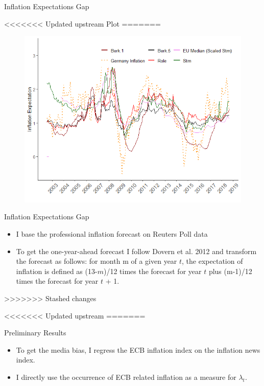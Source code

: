 \documentclass[aspectratio=169,xcolor=dvipsnames]{beamer}
\begin{document}
\begin{frame}{Inflation Expectations Gap}

<<<<<<< Updated upstream
Plot
=======
  \begin{figure}[!ht]
    \centering
    \includegraphics{Household_Inf_Exp.png}
    \end{figure}

\end{frame}


\begin{frame}{Inflation Expectations Gap}

 \begin{itemize}
 \item I base the professional inflation forecast on Reuters Poll data
 \item To get the one-year-ahead forecast I follow Dovern et al. 2012 and transform the forecast as follows: for month m of a given year $t$, the expectation of inflation is defined as (13-$m$)/12 times the forecast for year $t$ plus (m-1)/12 times the forecast for year $t$ + 1.
 \end{itemize}
>>>>>>> Stashed changes

\end{frame}


<<<<<<< Updated upstream
=======
\begin{frame}{Preliminary Results}

 \begin{itemize}
 \item To get the media bias, I regress the ECB inflation index on the inflation news index.
 \item I directly use the occurrence of ECB related inflation as a measure for $\lambda_t$.
 \end{itemize}

\end{frame}
\end{document}
